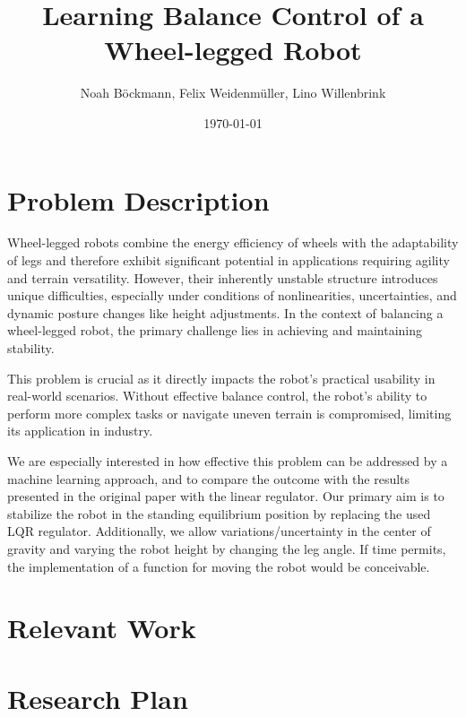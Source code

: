 \documentclass[a4paper]{article}
\title{Learning Balance Control of a Wheel-legged Robot}
\author{Noah Böckmann, Felix Weidenmüller, Lino Willenbrink}
\date{\today}
\begin{document}
\maketitle
\section{Problem Description}
Wheel-legged robots combine the energy efficiency of wheels with the adaptability of legs and therefore exhibit significant potential in applications requiring agility and terrain versatility.
However, their inherently unstable structure introduces unique difficulties, especially under conditions of nonlinearities, uncertainties, and dynamic posture changes like height adjustments.
In the context of balancing a wheel-legged robot, the primary challenge lies in achieving and maintaining stability.

This problem is crucial as it directly impacts the robot's practical usability in real-world scenarios.
Without effective balance control, the robot's ability to perform more complex tasks or navigate uneven terrain is compromised, limiting its application in industry.

We are especially interested in how effective this problem can be addressed by a machine learning approach, and to compare the outcome with the results presented in the original paper with the linear regulator.
Our primary aim is to stabilize the robot in the standing equilibrium position by replacing the used LQR regulator. Additionally, we allow variations/uncertainty in the center of gravity and varying the robot height by changing the leg angle.
If time permits, the implementation of a function for moving the robot would be conceivable.


\section{Relevant Work}

\section{Research Plan}
\end{document}
